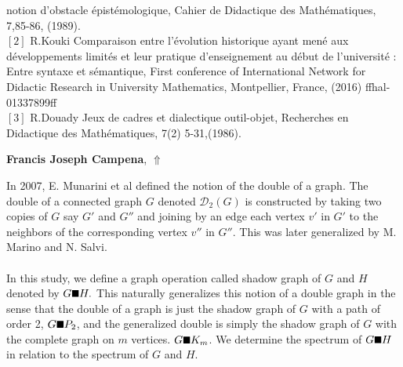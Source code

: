 \documentclass[ILAS2025-program.tex]{subfiles}
\begin{document}
\begin{ilasabstract}
notion d'obstacle \'epist\'emologique, Cahier de Didactique des Math\'ematiques, 7,85-86, (1989).
\\
$[2]$ R.Kouki Comparaison entre l'\'evolution historique ayant men\'e aux d\'eveloppements limit\'es et leur pratique
d'enseignement au d\'ebut de l'universit\'e : Entre syntaxe et s\'emantique, First conference of International Network for Didactic Research in University Mathematics, Montpellier, France, (2016) ffhal-01337899ff
\\
$[3]$ R.Douady Jeux de cadres et dialectique outil-objet, Recherches en Didactique des Math\'ematiques, 7(2) 5-31,(1986).  
\end{ilasabstract}
    

\hypertarget{down0422}{}\begin{ilasabstract}
    
\textbf{Francis Joseph Campena},  \hfill \hyperlink{up0422}{$\Uparrow$}
    
    
\mtskip
    In 2007, E. Munarini et al defined the notion of the double of a graph. The double of a connected graph $G$ denoted $\mathcal{D}_2(G)$  is constructed by taking two copies of $G$ say $G'$ and $G''$ and joining by an edge each vertex $v'$ in $G'$ to the neighbors of the corresponding vertex $v''$ in $G''$. This was later generalized by M. Marino and N. Salvi.\\~\\
\indent In this study, we define a graph operation called shadow graph of $G$ and $H$ denoted by $G \text{\small$ \blacksquare $} H.$ This naturally generalizes this notion of a double graph in the sense that the double of a graph is just the shadow graph of $G$ with a path of order 2, $G\text{\small$ \blacksquare $} P_2$, and the generalized double is simply the shadow graph of $G$ with the complete graph on $m$ vertices. $G\text{\small$ \blacksquare $} K_m$. We determine the spectrum of $G\text{\small$ \blacksquare $} H$  in relation to the spectrum of $G$ and $H$. 
\end{ilasabstract}
    
\end{document}
